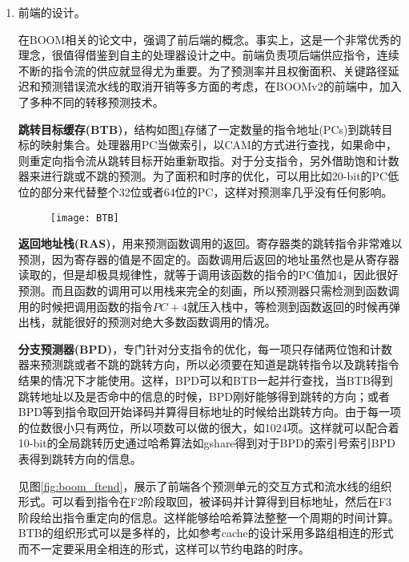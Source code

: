 	\begin{enumerate}[label=(\alph*)]
		\item 前端的设计。
		
		在BOOM相关的论文\citep{Celio:EECS-2017-157,Celio:EECS-2018-151}中，强调了前后端的概念。事实上，这是一个非常优秀的理念，很值得借鉴到自主的处理器设计之中。前端负责项后端供应指令，连续不断的指令流的供应就显得尤为重要。为了预测率并且权衡面积、关键路径延迟和预测错误流水线的取消开销等多方面的考虑，在BOOMv2的前端中，加入了多种不同的转移预测技术。
		
		\textbf{跳转目标缓存(BTB)}，结构如图\ref{fig:BTB}存储了一定数量的指令地址(PCs)到跳转目标的映射集合。处理器用PC当做索引，以CAM的方式进行查找，如果命中，则重定向指令流从跳转目标开始重新取指。对于分支指令，另外借助饱和计数器来进行跳或不跳的预测。为了面积和时序的优化，可以用比如20-bit的PC低位的部分来代替整个32位或者64位的PC\citep{Celio:EECS-2017-157}，这样对预测率几乎没有任何影响。
		\begin{figure}[!htbp]
			\centering
			\texttt{[image: BTB]}
			\label{fig:BTB}
		\end{figure}
	
		\textbf{返回地址栈(RAS)}，用来预测函数调用的返回。寄存器类的跳转指令非常难以预测，因为寄存器的值是不固定的。函数调用后返回的地址虽然也是从寄存器读取的，但是却极具规律性，就等于调用该函数的指令的PC值加4，因此很好预测。而且函数的调用可以用栈来完全的刻画，所以预测器只需检测到函数调用的时候把调用函数的指令$ PC+4 $就压入栈中，等检测到函数返回的时候再弹出栈，就能很好的预测对绝大多数函数调用的情况。
		
		\textbf{分支预测器(BPD)}，专门针对分支指令的优化，每一项只存储两位饱和计数器来预测跳或者不跳的跳转方向，所以必须要在知道是跳转指令以及跳转指令结果的情况下才能使用。这样，BPD可以和BTB一起并行查找，当BTB得到跳转地址以及是否命中的信息的时候，BPD刚好能够得到跳转的方向；或者BPD等到指令取回开始译码并算得目标地址的时候给出跳转方向。由于每一项的位数很小只有两位，所以项数可以做的很大，如1024项。这样就可以配合着10-bit的全局跳转历史通过哈希算法如gshare得到对于BPD的索引号索引BPD表得到跳转方向的信息。
		
		见图\ref{fig:boom_ftend}，展示了前端各个预测单元的交互方式和流水线的组织形式。可以看到指令在F2阶段取回，被译码并计算得到目标地址，然后在F3阶段给出指令重定向的信息。这样能够给哈希算法整整一个周期的时间计算。BTB的组织形式可以是多样的，比如参考cache的设计采用多路组相连的形式而不一定要采用全相连的形式，这样可以节约电路的时序。
		

\end{enumerate}
